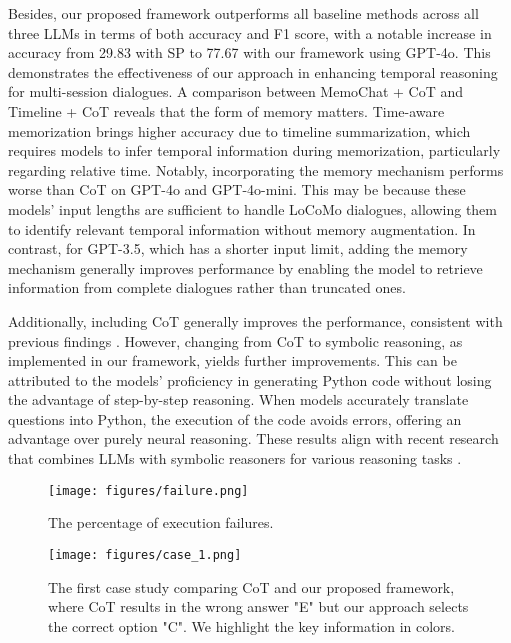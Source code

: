 Besides, our proposed framework outperforms all baseline methods across all three LLMs in terms of both accuracy and F1 score, with a notable increase in accuracy from 29.83 with SP to 77.67 with our framework using GPT-4o. This demonstrates the effectiveness of our approach in enhancing temporal reasoning for multi-session dialogues. A comparison between MemoChat + CoT and Timeline + CoT reveals that the form of memory matters. Time-aware memorization brings higher accuracy due to timeline summarization, which requires models to infer temporal information during memorization, particularly regarding relative time. Notably, incorporating the memory mechanism performs worse than CoT on GPT-4o and GPT-4o-mini. This may be because these models’ input lengths are sufficient to handle LoCoMo dialogues, allowing them to identify relevant temporal information without memory augmentation. In contrast, for GPT-3.5, which has a shorter input limit, adding the memory mechanism generally improves performance by enabling the model to retrieve information from complete dialogues rather than truncated ones.

Additionally, including CoT generally improves the performance, consistent with previous findings \cite{wang-zhao-2024-tram,xiong-etal-2024-large}. However, changing from CoT to symbolic reasoning, as implemented in our framework, yields further improvements. This can be attributed to the models' proficiency in generating Python code without losing the advantage of step-by-step reasoning. When models accurately translate questions into Python, the execution of the code avoids errors, offering an advantage over purely neural reasoning. These results align with recent research that combines LLMs with symbolic reasoners for various reasoning tasks \cite{olausson2023linc,pan2023logic}.

\begin{figure}  
\centering
\texttt{[image: figures/failure.png]}
    \caption{The percentage of execution failures.} 
    \label{fig:failure}
\vspace{-0.6cm}
\end{figure}

\begin{figure*}
    \centering
    \texttt{[image: figures/case\_1.png]}
    \caption{The first case study comparing CoT and our proposed framework, where CoT results in the wrong answer "E" but our approach selects the correct option "C". We highlight the key information in colors.}
    \label{fig:case_1}
\vspace{-0.5cm}
\end{figure*}

